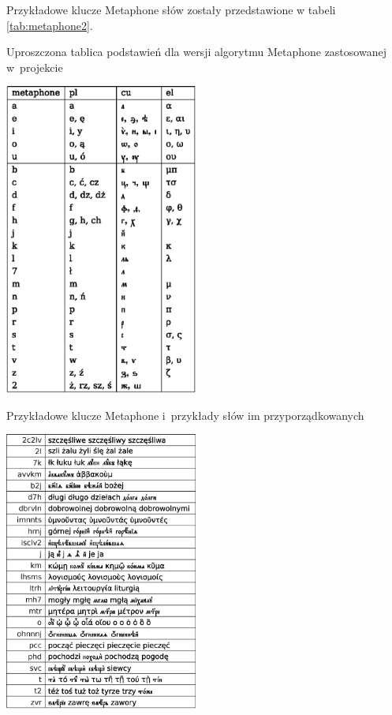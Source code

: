 \documentclass{pracamgr}
\begin{document}
Przykładowe klucze Metaphone słów zostały przedstawione w tabeli
\ref{tab:metaphone2}.

\begin{table}
  \small
  \caption{Uproszczona tablica podstawień dla wersji algorytmu
    Metaphone zastosowanej w~projekcie}
  \centering
  \includegraphics[width=2.5in]{metaphone.eps}
  \label{tab:metaphone}
\end{table}

\begin{table}
  \small
  \caption{Przykładowe klucze Metaphone i~przykłady słów im przyporządkowanych}
  \centering
  \includegraphics[width=2.5in]{metaphone2.eps}
  \label{tab:metaphone2}
\end{table}
\end{document}
